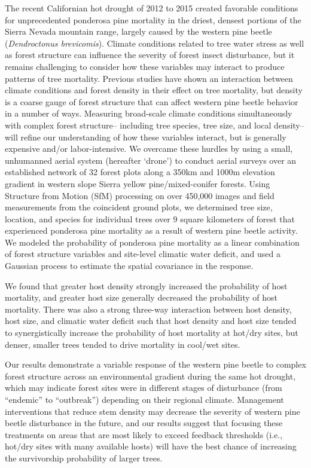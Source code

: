 \documentclass[]{article}
\begin{document}
The recent Californian hot drought of 2012 to 2015 created favorable
conditions for unprecedented ponderosa pine mortality in the driest,
densest portions of the Sierra Nevada mountain range, largely caused by
the western pine beetle (\emph{Dendroctonus brevicomis}). Climate
conditions related to tree water stress as well as forest structure can
influence the severity of forest insect disturbance, but it remains
challenging to consider how these variables may interact to produce
patterns of tree mortality. Previous studies have shown an interaction
between climate conditions and forest density in their effect on tree
mortality, but density is a coarse gauge of forest structure that can
affect western pine beetle behavior in a number of ways. Measuring
broad-scale climate conditions simultaneously with complex forest
structure-- including tree species, tree size, and local density-- will
refine our understanding of how these variables interact, but is
generally expensive and/or labor-intensive. We overcame these hurdles by
using a small, unhumanned aerial system (hereafter `drone') to conduct
aerial surveys over an established network of 32 forest plots along a
350km and 1000m elevation gradient in western slope Sierra yellow
pine/mixed-conifer forests. Using Structure from Motion (SfM) processing
on over 450,000 images and field measurements from the coincident ground
plots, we determined tree size, location, and species for individual
trees over 9 square kilometers of forest that experienced ponderosa pine
mortality as a result of western pine beetle activity. We modeled the
probability of ponderosa pine mortality as a linear combination of
forest structure variables and site-level climatic water deficit, and
used a Gaussian process to estimate the spatial covariance in the
response.

We found that greater host density strongly increased the probability of
host mortality, and greater host size generally decreased the
probability of host mortality. There was also a strong three-way
interaction between host density, host size, and climatic water deficit
such that host density and host size tended to synergistically increase
the probability of host mortality at hot/dry sites, but denser, smaller
trees tended to drive mortality in cool/wet sites.

Our results demonstrate a variable response of the western pine beetle
to complex forest structure across an environmental gradient during the
same hot drought, which may indicate forest sites were in different
stages of disturbance (from ``endemic'' to ``outbreak'') depending on
their regional climate. Management interventions that reduce stem
density may decrease the severity of western pine beetle disturbance in
the future, and our results suggest that focusing these treatments on
areas that are most likely to exceed feedback thresholds (i.e., hot/dry
sites with many available hosts) will have the best chance of increasing
the survivorship probability of larger trees.
\end{document}
